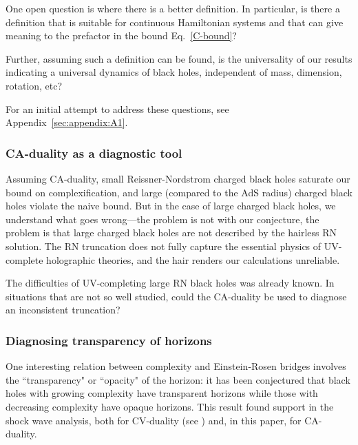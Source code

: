 \documentclass[12pt]{article}
\numberwithin{equation}{section}
\begin{document}
One open question is where there is a better definition. In particular, is there a definition that is suitable for continuous Hamiltonian systems and that can give meaning to the prefactor in the bound Eq.~\ref{C-bound}?

Further, assuming such a definition can be found, is the universality of our results indicating a universal dynamics of black holes, independent of mass, dimension, rotation, etc?


For an initial attempt to address these questions, see Appendix~\ref{sec:appendix:A1}.



\subsubsection{CA-duality  as a diagnostic tool}

Assuming CA-duality, small Reissner-Nordstrom charged black holes saturate our bound on complexification, and large (compared to the AdS radius) charged black  holes violate the naive bound. But in the case of large charged black holes, we understand what goes wrong---the problem is not with our conjecture, the problem is that large charged black holes are not described by the hairless RN solution. The RN truncation does not fully capture the essential physics of UV-complete holographic theories, and the hair renders our calculations unreliable.

The difficulties of UV-completing large RN black holes was already known. In situations that are not so well studied, could the CA-duality be used to diagnose an inconsistent truncation?





\subsubsection{Diagnosing transparency of horizons}

One interesting relation between complexity and Einstein-Rosen bridges involves the ``transparency" or ``opacity" of the horizon: it has been conjectured that black holes with growing complexity have transparent horizons \cite{opacity} while those with decreasing complexity have opaque horizons. This result found support in the shock wave analysis, both for CV-duality (see \cite{opacity}) and, in this paper, for CA-duality.
\end{document}
